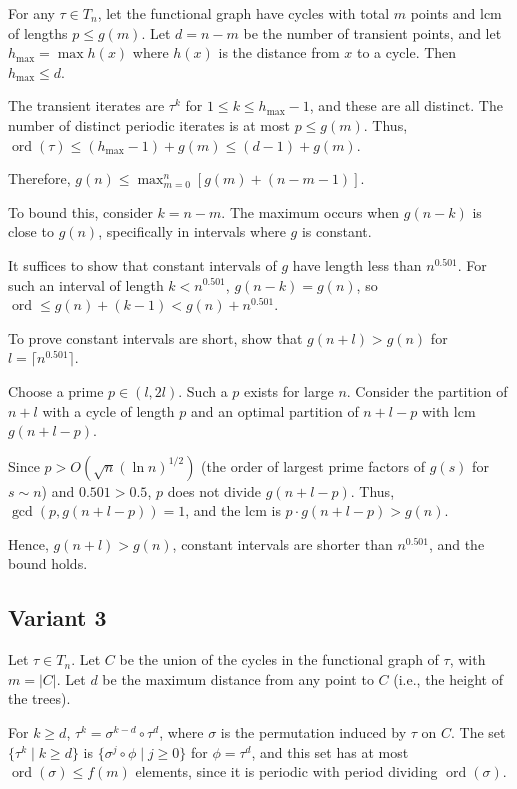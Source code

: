 \documentclass[12pt,a4paper]{article}
\theoremstyle{definition}
\begin{document}
    For any $\tau \in T_n$, let the functional graph have cycles with total $m$ points and lcm of lengths $p \leq g(m)$. Let $d = n - m$ be the number of transient points, and let $h_{\max} = \max h(x)$ where $h(x)$ is the distance from $x$ to a cycle. Then $h_{\max} \leq d$.

    The transient iterates are $\tau^k$ for $1 \leq k \leq h_{\max} - 1$, and these are all distinct. The number of distinct periodic iterates is at most $p \leq g(m)$. Thus, $\operatorname{ord}(\tau) \leq (h_{\max} - 1) + g(m) \leq (d - 1) + g(m)$.

    Therefore, $g(n) \leq \max_{m=0}^n [g(m) + (n - m - 1)]$.

    To bound this, consider $k = n - m$. The maximum occurs when $g(n - k)$ is close to $g(n)$, specifically in intervals where $g$ is constant.

    It suffices to show that constant intervals of $g$ have length less than $n^{0.501}$. For such an interval of length $k < n^{0.501}$, $g(n - k) = g(n)$, so $\operatorname{ord} \leq g(n) + (k - 1) < g(n) + n^{0.501}$.

    To prove constant intervals are short, show that $g(n + l) > g(n)$ for $l = \lceil n^{0.501} \rceil$.

    Choose a prime $p \in (l, 2l)$. Such a $p$ exists for large $n$. Consider the partition of $n + l$ with a cycle of length $p$ and an optimal partition of $n + l - p$ with lcm $g(n + l - p)$.

    Since $p > O(\sqrt{n} (\ln n)^{1/2})$ (the order of largest prime factors of $g(s)$ for $s \sim n$) and $0.501 > 0.5$, $p$ does not divide $g(n + l - p)$. Thus, $\gcd(p, g(n + l - p)) = 1$, and the lcm is $p \cdot g(n + l - p) > g(n)$.

    Hence, $g(n + l) > g(n)$, constant intervals are shorter than $n^{0.501}$, and the bound holds.

\subsection{Variant 3}
    Let $\tau \in T_n$. Let $C$ be the union of the cycles in the functional graph of $\tau$, with $m = |C|$. Let $d$ be the maximum distance from any point to $C$ (i.e., the height of the trees).

    For $k \geq d$, $\tau^k = \sigma^{k-d} \circ \tau^d$, where $\sigma$ is the permutation induced by $\tau$ on $C$. The set $\{\tau^k \mid k \geq d\}$ is $\{\sigma^j \circ \phi \mid j \geq 0\}$ for $\phi = \tau^d$, and this set has at most $\operatorname{ord}(\sigma) \leq f(m)$ elements, since it is periodic with period dividing $\operatorname{ord}(\sigma)$.
\end{document}
